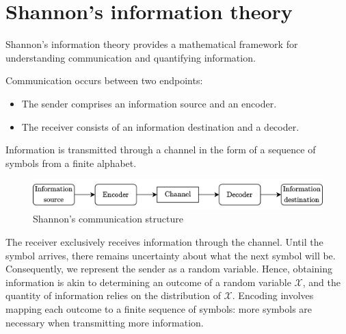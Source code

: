 \section{Shannon's information theory}

Shannon's information theory provides a mathematical framework for understanding communication and quantifying information.

Communication occurs between two endpoints:
\begin{itemize}
    \item The sender comprises an information source and an encoder.
    \item The receiver consists of an information destination and a decoder.
\end{itemize}
Information is transmitted through a channel in the form of a sequence of symbols from a finite alphabet.
\begin{figure}[H]
    \centering
    \includegraphics[width=1\linewidth]{images/sha.png}
    \caption{Shannon's communication structure}
\end{figure}
The receiver exclusively receives information through the channel. 
Until the symbol arrives, there remains uncertainty about what the next symbol will be. 
Consequently, we represent the sender as a random variable. 
Hence, obtaining information is akin to determining an outcome of a random variable $\mathcal{X}$, and the quantity of information relies on the distribution of $\mathcal{X}$. 
Encoding involves mapping each outcome to a finite sequence of symbols: more symbols are necessary when transmitting more information.


